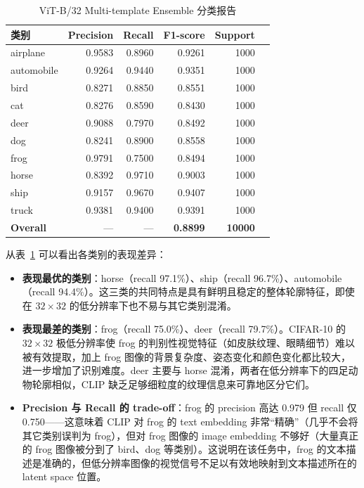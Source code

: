 \documentclass[12pt,a4paper]{ctexart}
\begin{document}
\begin{table}[H]
\centering
\caption{ViT-B/32 Multi-template Ensemble 分类报告}
\label{tab:vitb32-report}
\begin{tabular}{lrrrrr}
\toprule
类别 & Precision & Recall & F1-score & Support \\
\midrule
airplane   & 0.9583 & 0.8960 & 0.9261 & 1000 \\
automobile & 0.9264 & 0.9440 & 0.9351 & 1000 \\
bird       & 0.8271 & 0.8850 & 0.8551 & 1000 \\
cat        & 0.8276 & 0.8590 & 0.8430 & 1000 \\
deer       & 0.9088 & 0.7970 & 0.8492 & 1000 \\
dog        & 0.8241 & 0.8900 & 0.8558 & 1000 \\
frog       & 0.9791 & 0.7500 & 0.8494 & 1000 \\
horse      & 0.8392 & 0.9710 & 0.9003 & 1000 \\
ship       & 0.9157 & 0.9670 & 0.9407 & 1000 \\
truck      & 0.9381 & 0.9400 & 0.9391 & 1000 \\
\midrule
\textbf{Overall} & --- & --- & \textbf{0.8899} & \textbf{10000} \\
\bottomrule
\end{tabular}
\end{table}

从表~\ref{tab:vitb32-report} 可以看出各类别的表现差异：

\begin{itemize}
    \item \textbf{表现最优的类别}：horse（recall 97.1\%）、ship（recall 96.7\%）、automobile（recall 94.4\%）。这三类的共同特点是具有鲜明且稳定的整体轮廓特征，即使在 $32\times32$ 的低分辨率下也不易与其它类别混淆。
    \item \textbf{表现最差的类别}：frog（recall 75.0\%）、deer（recall 79.7\%）。CIFAR-10 的 $32\times32$ 极低分辨率使 frog 的判别性视觉特征（如皮肤纹理、眼睛细节）难以被有效提取，加上 frog 图像的背景复杂度、姿态变化和颜色变化都比较大，进一步增加了识别难度。deer 主要与 horse 混淆，两者在低分辨率下的四足动物轮廓相似，CLIP 缺乏足够细粒度的纹理信息来可靠地区分它们。
    \item \textbf{Precision 与 Recall 的 trade-off}：frog 的 precision 高达 0.979 但 recall 仅 0.750——这意味着 CLIP 对 frog 的 text embedding 非常“精确”（几乎不会将其它类别误判为 frog），但对 frog 图像的 image embedding 不够好（大量真正的 frog 图像被分到了 bird、dog 等类别）。这说明在该任务中，frog 的文本描述是准确的，但低分辨率图像的视觉信号不足以有效地映射到文本描述所在的 latent space 位置。
\end{itemize}
\end{document}

